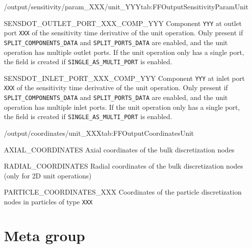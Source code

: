 \begin{groupscope}{/output/sensitivity/param\_XXX/unit\_YYY}{tab:FFOutputSensitivityParamUnit}
\begin{dataset}[type=double,unit={\si{\mol\per\cubic\metre\of{IV}\per\second\per\ParamUnit}}]{SENSDOT\_OUTLET\_PORT\_XXX\_COMP\_YYY}
    Component \texttt{YYY} at outlet port \texttt{XXX} of the sensitivity time derivative of the unit operation.
    Only present if \texttt{SPLIT\_COMPONENTS\_DATA} and \texttt{SPLIT\_PORTS\_DATA} are enabled, and the unit operation has multiple outlet ports.
    If the unit operation only has a single port, the field is created if \texttt{SINGLE\_AS\_MULTI\_PORT} is enabled.
  \end{dataset}
  \begin{dataset}[type=double,unit={\si{\mol\per\cubic\metre\of{IV}\per\second\per\ParamUnit}}]{SENSDOT\_INLET\_PORT\_XXX\_COMP\_YYY}
    Component \texttt{YYY} at inlet port \texttt{XXX} of the sensitivity time derivative of the unit operation.
    Only present if \texttt{SPLIT\_COMPONENTS\_DATA} and \texttt{SPLIT\_PORTS\_DATA} are enabled, and the unit operation has multiple inlet ports.
    If the unit operation only has a single port, the field is created if \texttt{SINGLE\_AS\_MULTI\_PORT} is enabled.
  \end{dataset}
\end{groupscope}

\begin{groupscope}{/output/coordinates/unit\_XXX}{tab:FFOutputCoordinatesUnit}
  \begin{dataset}[type=double,unit={\si{\metre}},length=\texttt{NCOL}]{AXIAL\_COORDINATES}
    Axial coordinates of the bulk discretization nodes
  \end{dataset}
  \begin{dataset}[type=double,unit={\si{\metre}},length=\texttt{NRAD}]{RADIAL\_COORDINATES}
    Radial coordinates of the bulk discretization nodes (only for 2D unit operations)
  \end{dataset}
  \begin{dataset}[type=double,unit={\si{\metre}},length=\texttt{NPAR}]{PARTICLE\_COORDINATES\_XXX}
    Coordinates of the particle discretization nodes in particles of type \texttt{XXX}
  \end{dataset}
\end{groupscope}

\section{Meta group}

